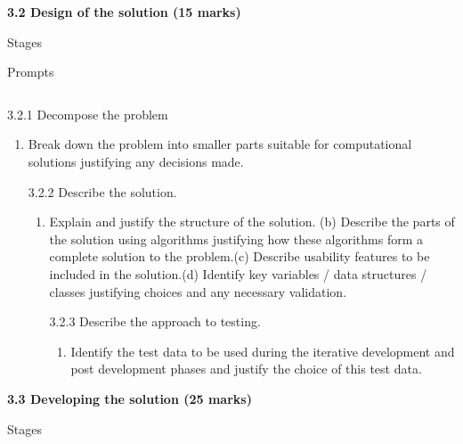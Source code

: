 \documentclass[11pt]{article}
\providecommand{\tightlist}{%
      \setlength{\itemsep}{0pt}\setlength{\parskip}{0pt}}
\begin{document}
    \textbf{3.2 Design of the solution (15 marks)}

\textbar{}

Stages

\textbar{}

Prompts

\begin{longtable}[]{@{}lc@{}}
\toprule
\bottomrule
\end{longtable}

\textbar{}

3.2.1 Decompose the problem

\textbar{}

\begin{enumerate}
\def\labelenumi{(\alph{enumi})}
\tightlist
\item
  Break down the problem into smaller parts suitable for computational
  solutions justifying any decisions made.

  \textbar{} \textbar{}

  3.2.2 Describe the solution.

  \textbar{}

  \begin{enumerate}
  \def\labelenumii{(\alph{enumii})}
  \tightlist
  \item
    Explain and justify the structure of the solution. (b) Describe the
    parts of the solution using algorithms justifying how these
    algorithms form a complete solution to the problem.(c) Describe
    usability features to be included in the solution.(d) Identify key
    variables / data structures / classes justifying choices and any
    necessary validation.

    \textbar{} \textbar{}

    3.2.3 Describe the approach to testing. \textbar{}

    \begin{enumerate}
    \def\labelenumiii{(\alph{enumiii})}
    \tightlist
    \item
      Identify the test data to be used during the iterative development
      and post development phases and justify the choice of this test
      data.
    \end{enumerate}
  \end{enumerate}
\end{enumerate}

    \textbf{3.3 Developing the solution (25 marks)}

\textbar{}

Stages
\end{document}
